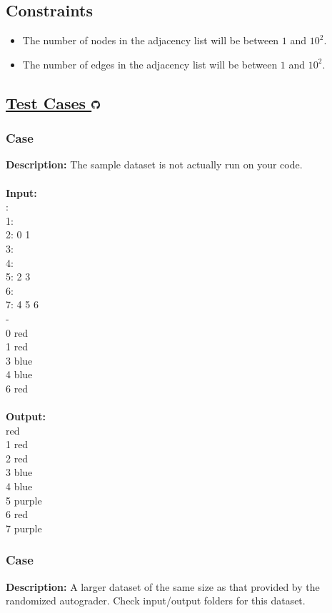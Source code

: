 \documentclass{article}
\newcommand{\code}[1]{{\fontfamily{pcr}\selectfont #1}}
\newcommand{\gitlogo}{\includegraphics[height=12.5]{c0/gitlogo.png}}
\begin{document}
\subsection*{Constraints}
\begin{itemize}
    \item The number of nodes in the adjacency list will be between $1$ and $10^2$.
    \item The number of edges in the adjacency list will be between $1$ and $10^2$.
\end{itemize}
\pagebreak

\subsection*{\href{https://github.com/rjeveloff/BA_problemregister/tree/main/test_cases/chapter_9/9P}{Test Cases \gitlogo}}
\subsubsection*{Case }
\hline \vspace{5}
\textbf{Description:} The sample dataset is not actually run on your code.\\ \\
\noindent \textbf{Input:}\\
\code{0:\\1:\\2: 0 1\\3:\\4:\\5: 2 3\\6:\\7: 4 5 6\\-\\0 red\\1 red\\3 blue\\4 blue\\6 red}\\ \\
\noindent \textbf{Output:}\\
\code{0 red\\1 red\\2 red\\3 blue\\4 blue\\5 purple\\6 red\\7 purple}

\subsubsection*{Case }
\hline \vspace{5}
\textbf{Description:} A larger dataset of the same size as that provided by the randomized autograder. Check input/output folders for this dataset.\\ \\
\pagebreak
\end{document}

